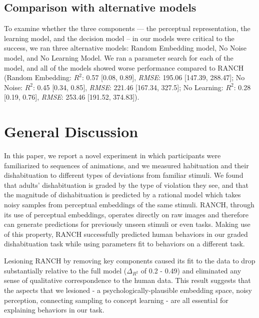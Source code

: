 \documentclass[10pt, letterpaper]{article}
\begin{document}
\hypertarget{comparison-with-alternative-models}{%
\subsection{Comparison with alternative
models}\label{comparison-with-alternative-models}}

To examine whether the three components --- the perceptual
representation, the learning model, and the decision model -- in our
models were critical to the success, we ran three alternative models:
Random Embedding model, No Noise model, and No Learning Model. We ran a
parameter search for each of the model, and all of the models showed
worse performance compared to RANCH (Random Embedding: \(R^2\): 0.57
{[}0.08, 0.89{]}, \emph{RMSE}: 195.06 {[}147.39, 288.47{]}; No Noise:
\(R^2\): 0.45 {[}0.34, 0.85{]}, \emph{RMSE}: 221.46 {[}167.34, 327.5{]};
No Learning: \(R^2\): 0.28 {[}0.19, 0.76{]}, \emph{RMSE}: 253.46
{[}191.52, 374.83{]}).

\hypertarget{general-discussion}{%
\section{General Discussion}\label{general-discussion}}

In this paper, we report a novel experiment in which participants were
familiarized to sequences of animations, and we measured habituation and
their dishabituation to different types of deviations from familiar
stimuli. We found that adults' dishabituation is graded by the type of
violation they see, and that the magnitude of dishabituation is
predicted by a rational model which takes noisy samples from perceptual
embeddings of the same stimuli. RANCH, through its use of perceptual
embeddings, operates directly on raw images and therefore can generate
predictions for previously unseen stimuli or even tasks. Making use of
this property, RANCH successfully predicted human behaviors in our
graded dishabituation task while using parameters fit to behaviors on a
different task.

Lesioning RANCH by removing key components caused its fit to the data to
drop substantially relative to the full model (\(\Delta_{R^2}\) of 0.2 -
0.49) and eliminated any sense of qualitative correspondence to the
human data. This result suggests that the aspects that we lesioned - a
psychologically-plausible embedding space, noisy perception, connecting
sampling to concept learning - are all essential for explaining
behaviors in our task.
\end{document}
